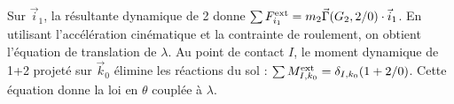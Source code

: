 \begin{corrigebox}
Sur $\vec i_1$, la résultante dynamique de 2 donne
                $\sum F_{i_1}^{\rm ext}=m_2\vec\Gamma(G_2,2/0)\cdot\vec i_1$.
                En utilisant l'accélération cinématique et la contrainte de roulement, on
                obtient l'équation de translation de $\lambda$.
Au point de contact $I$, le moment dynamique de 1+2 projeté sur
                $\vec k_0$ élimine les réactions du sol :
                $\sum M_{I,k_0}^{\rm ext}=\delta_{I,k_0}(1+2/0)$. Cette équation donne la
                loi en $\theta$ couplée à $\lambda$.
\end{corrigebox}
